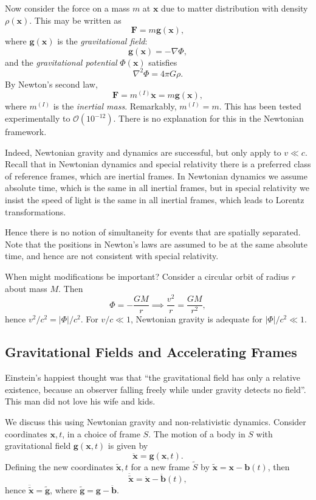 \documentclass[12pt]{article}
\begin{document}
Now consider the force on a mass $m$ at $\mathbf{x}$ due to matter distribution with density $\rho(\mathbf{x})$. This may be written as
\[
\mathbf{F} = m \mathbf{g}(\mathbf{x}),
\]
where $\mathbf{g}(\mathbf{x})$ is the \emph{gravitational field}:
\[
\mathbf{g}(\mathbf{x}) = - \nabla \Phi,
\]
and the \emph{gravitational potential} $\Phi(\mathbf{x})$ satisfies
\[
\nabla^2 \Phi = 4 \pi G \rho.
\]
By Newton's second law,
\[
\mathbf{F} = m^{(I)} \mathbf{\ddot x} = m \mathbf{g}(\mathbf{x}),
\]
where $m^{(I)}$ is the \emph{inertial mass}. Remarkably, $m^{(I)} = m$. This has been tested experimentally to $\mathcal{O}(10^{-12})$. There is no explanation for this in the Newtonian framework.

Indeed, Newtonian gravity and dynamics are successful, but only apply to $v \ll c$. Recall that in Newtonian dynamics and special relativity there is a preferred class of reference frames, which are inertial frames. In Newtonian dynamics we assume absolute time, which is the same in all inertial frames, but in special relativity we insist the speed of light is the same in all inertial frames, which leads to Lorentz transformations.

Hence there is no notion of simultaneity for events that are spatially separated. Note that the positions in Newton's laws are assumed to be at the same absolute time, and hence are not consistent with special relativity.

When might modifications be important? Consider a circular orbit of radius $r$ about mass $M$. Then
\[
\Phi = - \frac{GM}{r} \implies \frac{v^2}{r} = \frac{GM}{r^2},
\]
hence $v^2/c^2 = |\Phi|/c^2$. For $v/c \ll 1$, Newtonian gravity is adequate for $|\Phi|/c^2 \ll 1$.

\subsection{Gravitational Fields and Accelerating Frames}
\label{sub:grav_accel}

Einstein's happiest thought was that ``the gravitational field has only a relative existence, because an observer falling freely while under gravity detects no field''. This man did not love his wife and kids.

We discuss this using Newtonian gravity and non-relativistic dynamics. Consider coordinates $\mathbf{x}, t$, in a choice of frame $S$. The motion of a body in $S$ with gravitational field $\mathbf{g}(\mathbf{x}, t)$ is given by
\[
\mathbf{\ddot x} = \mathbf{g}(\mathbf{x}, t).
\]
Defining the new coordinates $\mathbf{\tilde x}, t$ for a new frame $\tilde S$ by $\mathbf{\tilde x} = \mathbf{x} - \mathbf{b}(t)$, then
\[
	\mathbf{\ddot{\tilde x}} = \mathbf{\ddot x} - \mathbf{\ddot b}(t),
\]
hence $\mathbf{\ddot{\tilde x}} = \mathbf{\tilde g}$, where $\mathbf{\tilde g} = \mathbf{g} - \mathbf{\ddot b}$.
\end{document}
